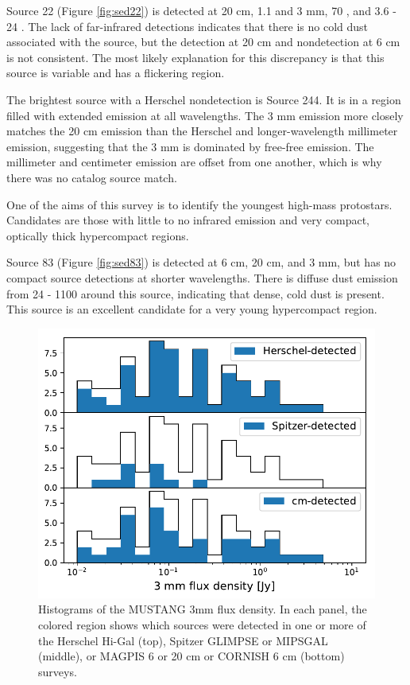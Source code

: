 \documentclass[twocolumn]{aastex62}
\begin{document}
Source 22 (Figure \ref{fig:sed22}) is detected at 20 cm, 1.1 and 3 mm, 70 \um,
and 3.6 - 24 \um.  The lack of far-infrared detections indicates that there is
no cold dust associated with the source, but the detection at 20 cm and
nondetection at 6 cm is not consistent.  The most likely explanation for this
discrepancy is that this source is variable and has a flickering \hii region.

The brightest source with a Herschel nondetection is Source 244.  It is in a
region filled with extended emission at all wavelengths.  The 3 mm emission
more closely matches the 20 cm emission than the Herschel and longer-wavelength
millimeter emission, suggesting that the 3 mm is dominated by free-free
emission.  The millimeter and centimeter emission are offset from one another,
which is why there was no catalog source match.

One of the aims of this survey is to identify the youngest high-mass protostars.
Candidates are those with little to no infrared emission and very compact, optically
thick hypercompact \hii regions.

Source 83 (Figure \ref{fig:sed83}) is detected at 6 cm, 20 cm, and 3 mm, but has no compact source detections
at shorter wavelengths.  There is diffuse dust emission from 24 - 1100 \um around this
source, indicating that dense, cold dust is present.  This source is an excellent
candidate for a very young hypercompact \hii region.


\begin{figure}[htp]
    \includegraphics[scale=1]{figures/G31_dend_contour_thr4_minn20_mind1_detection_histograms.pdf}
\caption{Histograms of the MUSTANG 3mm flux density.  In each panel, the colored region shows which
sources were detected in one or more of the Herschel Hi-Gal (top), Spitzer GLIMPSE or MIPSGAL (middle),
or MAGPIS 6 or 20 cm or CORNISH 6 cm (bottom) surveys.}
\label{fig:histogram}
\end{figure}
\end{document}
